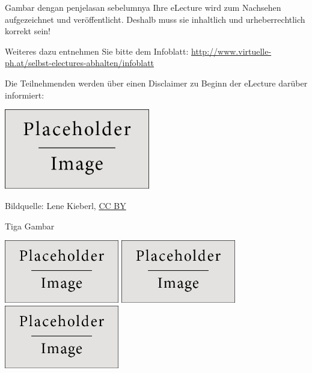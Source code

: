 \documentclass[main.tex]{subfiles}
\begin{document}
\begin{frame}{Gambar dengan penjelasan sebelumnya}
	\small Ihre eLecture wird zum Nachsehen aufgezeichnet und veröffentlicht. Deshalb muss sie inhaltlich und urheberrechtlich korrekt sein!

	\tiny Weiteres dazu entnehmen Sie bitte dem Infoblatt: \url{http://www.virtuelle-ph.at/selbst-electures-abhalten/infoblatt}

	\small Die Teilnehmenden werden über einen Disclaimer zu Beginn der eLecture darüber informiert:

	\begin{center}
		\includegraphics[height=3.5cm]{figures/placeholder}

		{\tiny \textcolor{digiPH_darkorange}{Bildquelle: Lene Kieberl, \href{https://creativecommons.org/licenses/by/3.0/at/}{CC BY}}}
	\end{center}
\end{frame}

\begin{frame}[t]{Tiga Gambar}

	\hfil\hfil\includegraphics[width=5cm]{figures/placeholder}\newline
	\null\hfil\hfil{}\newline
	\vfil
	\hfil\hfil{\includegraphics[width=5cm]{figures/placeholder}}\hfil\hfil
	{\includegraphics[width=5cm]{figures/placeholder}}\newline
	\null\hfil\hfil{}
	\hfil\hfil{}

\end{frame}
\end{document}
